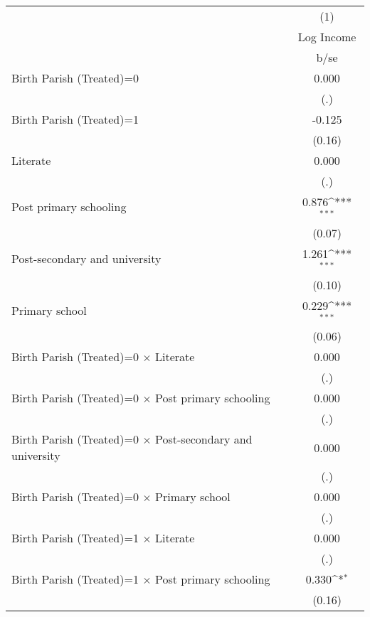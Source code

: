 {
\def\sym#1{\ifmmode^{#1}\else\(^{#1}\)\fi}
\begin{tabular}{l*{1}{c}}
\hline\hline
                    &\multicolumn{1}{c}{(1)}\\
                    &\multicolumn{1}{c}{Log Income}\\
                    &        b/se         \\
\hline
Birth Parish (Treated)=0&       0.000         \\
                    &         (.)         \\
Birth Parish (Treated)=1&      -0.125         \\
                    &      (0.16)         \\
Literate            &       0.000         \\
                    &         (.)         \\
Post primary schooling&       0.876\sym{***}\\
                    &      (0.07)         \\
Post-secondary and university&       1.261\sym{***}\\
                    &      (0.10)         \\
Primary school      &       0.229\sym{***}\\
                    &      (0.06)         \\
Birth Parish (Treated)=0 $\times$ Literate&       0.000         \\
                    &         (.)         \\
Birth Parish (Treated)=0 $\times$ Post primary schooling&       0.000         \\
                    &         (.)         \\
Birth Parish (Treated)=0 $\times$ Post-secondary and university&       0.000         \\
                    &         (.)         \\
Birth Parish (Treated)=0 $\times$ Primary school&       0.000         \\
                    &         (.)         \\
Birth Parish (Treated)=1 $\times$ Literate&       0.000         \\
                    &         (.)         \\
Birth Parish (Treated)=1 $\times$ Post primary schooling&       0.330\sym{*}  \\
                    &      (0.16)         \\

\end{tabular}}
